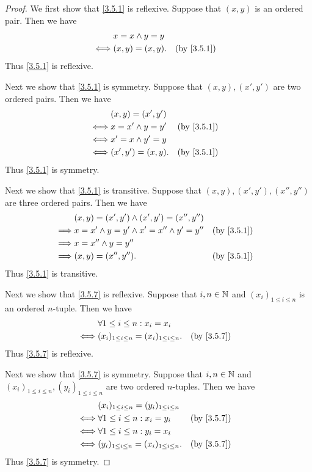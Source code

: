 \begin{proof}
	We first show that \cref{3.5.1} is reflexive.
	Suppose that \((x, y)\) is an ordered pair.
	Then we have
	\begin{align*}
		     & x = x \land y = y                 \\
		\iff & (x, y) = (x, y).  &  & \by{3.5.1}
	\end{align*}
	Thus \cref{3.5.1} is reflexive.

	Next we show that \cref{3.5.1} is symmetry.
	Suppose that \((x, y), (x', y')\) are two ordered pairs.
	Then we have
	\begin{align*}
		     & (x, y) = (x', y')                   \\
		\iff & x = x' \land y = y' &  & \by{3.5.1} \\
		\iff & x' = x \land y' = y                 \\
		\iff & (x', y') = (x, y).  &  & \by{3.5.1}
	\end{align*}
	Thus \cref{3.5.1} is symmetry.

	Next we show that \cref{3.5.1} is transitive.
	Suppose that \((x, y), (x', y'), (x'', y'')\) are three ordered pairs.
	Then we have
	\begin{align*}
		         & (x, y) = (x', y') \land (x', y') = (x'', y'')                     \\
		\implies & x = x' \land y = y' \land x' = x'' \land y' = y'' &  & \by{3.5.1} \\
		\implies & x = x'' \land y = y''                                             \\
		\implies & (x, y) = (x'', y'').                              &  & \by{3.5.1}
	\end{align*}
	Thus \cref{3.5.1} is transitive.

	Next we show that \cref{3.5.7} is reflexive.
	Suppose that \(i, n \in \mathbb{N}\) and \((x_i)_{1 \leq i \leq n}\) is an ordered \(n\)-tuple.
	Then we have
	\begin{align*}
		     & \forall 1 \leq i \leq n : x_i = x_i                                \\
		\iff & (x_i)_{1 \leq i \leq n} = (x_i)_{1 \leq i \leq n}. &  & \by{3.5.7}
	\end{align*}
	Thus \cref{3.5.7} is reflexive.

	Next we show that \cref{3.5.7} is symmetry.
	Suppose that \(i, n \in \mathbb{N}\) and \((x_i)_{1 \leq i \leq n}, (y_i)_{1 \leq i \leq n}\) are two ordered \(n\)-tuples.
	Then we have
	\begin{align*}
		     & (x_i)_{1 \leq i \leq n} = (y_i)_{1 \leq i \leq n}                  \\
		\iff & \forall 1 \leq i \leq n : x_i = y_i                &  & \by{3.5.7} \\
		\iff & \forall 1 \leq i \leq n : y_i = x_i                                \\
		\iff & (y_i)_{1 \leq i \leq n} = (x_i)_{1 \leq i \leq n}. &  & \by{3.5.7}
	\end{align*}
	Thus \cref{3.5.7} is symmetry.


\end{proof}
